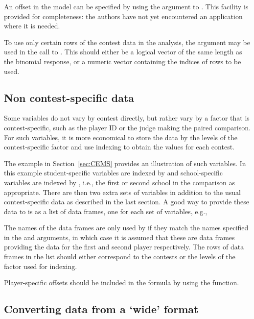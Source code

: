 An offset in the model can be specified by
using the  argument to \null.  This facility is
provided for completeness: the authors have not yet encountered
an application where it is needed.

To use only certain rows of the contest data in the analysis, the 
argument may be used in the call to .  This should either be a
logical vector of the same length as the binomial response, or a numeric vector
containing the indices of rows to be used.


\subsection{Non contest-specific data}
\label{sec:non-contest}

Some variables do not vary by contest directly, but rather vary by a factor
that is contest-specific, such as the player ID or the judge making the paired
comparison. For such variables, it is more economical to store the data by
the levels of the contest-specific factor and use indexing to obtain the
values for each contest.

The  example in Section~\ref{sec:CEMS} provides an illustration of
such variables.  In this example student-specific variables are indexed by
 and school-specific variables are indexed by , i.e.,
the first or second school in the comparison as appropriate. There are then
two extra sets of variables in addition to the usual contest-specific data as
described in the last section. A good way to provide these data to 
is as a list of data frames, one for each set of variables, e.g.,

\Rcodeplaceholder{}

The names of the data frames are only used by  if they match the
names specified in the  and  arguments, in which
case it is assumed that these are data frames providing the data for the first
and second player respectively. The rows of data frames in the list should
either correspond to the contests or the levels of the factor used for
indexing.

Player-specific offsets should be included in the formula by using the
 function.

\subsection{Converting data from a `wide' format}

